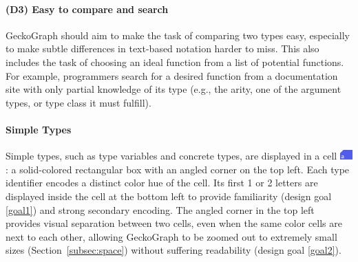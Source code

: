 \paragraph{\textbf{(D3) Easy to compare and search}} \label{goal3} GeckoGraph should aim to make the task of comparing two types easy, especially to make subtle differences in text-based notation harder to miss. This also includes the task of choosing an ideal function from a list of potential functions. For example, programmers search for a desired function from a documentation site with only partial knowledge of its type (e.g., the arity, one of the argument types, or type class it must fulfill). 


\paragraph{Simple Types} 
Simple types, such as type variables and concrete types, are displayed in a cell \includegraphics[height=1em]{figures/SimpleType}: a solid-colored rectangular box with an angled corner on the top left. Each type identifier encodes a distinct color hue of the cell.  Its first 1 or 2 letters are displayed inside the cell at the bottom left to provide familiarity (design goal \ref{goal1}) and strong secondary encoding. The angled corner in the top left provides visual separation between two cells, even when the same color cells are next to each other, allowing GeckoGraph to be zoomed out to extremely small sizes (Section~\ref{subsec:space}) without suffering readability (design goal \ref{goal2}).

